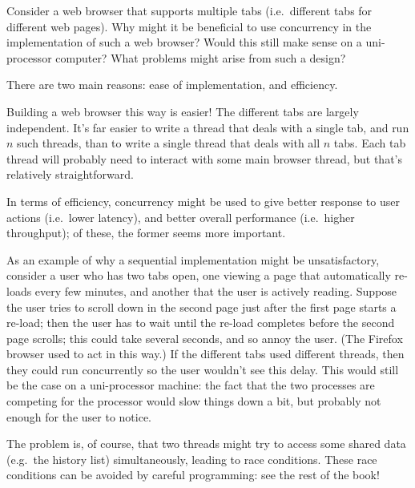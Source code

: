 \begin{questionS}
Consider a web browser that supports multiple tabs (i.e.~different
tabs for different web pages).  Why might it be beneficial to use
concurrency in the implementation of such a web browser?  Would this
still make sense on a uni-processor computer?  What problems might
arise from such a design?
\end{questionS}


\begin{answerS}
There are two main reasons: ease of implementation, and efficiency.

Building a web browser this way is easier!  The different tabs are largely
independent.  It's far easier to write a thread that deals with a single tab,
and run $n$ such threads, than to write a single thread that deals with all
$n$ tabs.  Each tab thread will probably need to interact with some main
browser thread, but that's relatively straightforward.

In terms of efficiency, concurrency might be used to give better response to
user actions (i.e.\ lower latency), and better overall performance (i.e.\
higher throughput); of these, the former seems more important.

As an example of why a sequential implementation might be unsatisfactory,
consider a user who has two tabs open, one viewing a page that automatically
re-loads every few minutes, and another that the user is actively reading.
Suppose the user tries to scroll down in the second page just after the first
page starts a re-load; then the user has to wait until the re-load completes
before the second page scrolls; this could take several seconds, and so annoy
the user.  (The Firefox browser used to act in this way.)  If the different
tabs used different threads, then they could run concurrently so the user
wouldn't see this delay.  This would still be the case on a uni-processor
machine: the fact that the two processes are competing for the processor would
slow things down a bit, but probably not enough for the user to notice.

The problem is, of course, that two threads might try to access some shared
data (e.g.~the history list) simultaneously, leading to race conditions.
These race conditions can be avoided by careful programming: see the rest of
the book!
\end{answerS}
